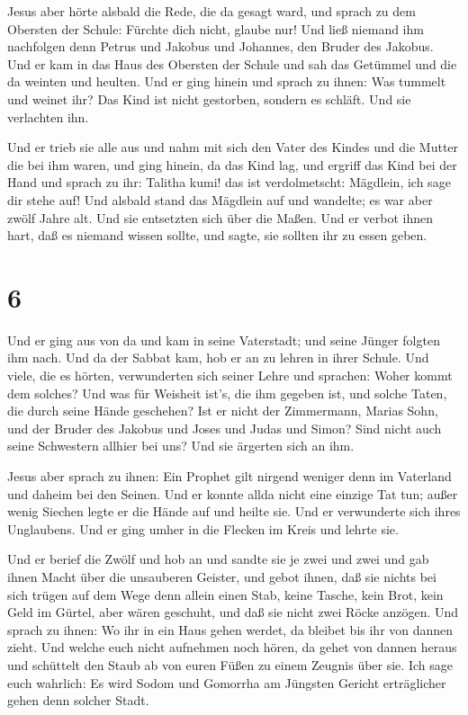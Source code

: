  Jesus aber hörte alsbald die Rede, die da gesagt ward, und
sprach zu dem Obersten der Schule: Fürchte dich nicht, glaube nur!
 Und ließ niemand ihm nachfolgen denn Petrus und Jakobus
und Johannes, den Bruder des Jakobus.  Und er kam in das
Haus des Obersten der Schule und sah das Getümmel und die da weinten und
heulten.  Und er ging hinein und sprach zu ihnen: Was
tummelt und weinet ihr? Das Kind ist nicht gestorben, sondern es
schläft. Und sie verlachten ihn.

 Und er trieb sie alle aus und nahm mit sich den Vater des
Kindes und die Mutter die bei ihm waren, und ging hinein, da das Kind
lag,  und ergriff das Kind bei der Hand und sprach zu ihr:
Talitha kumi! das ist verdolmetscht: Mägdlein, ich sage dir stehe auf!
 Und alsbald stand das Mägdlein auf und wandelte; es war
aber zwölf Jahre alt. Und sie entsetzten sich über die Maßen.
 Und er verbot ihnen hart, daß es niemand wissen sollte,
und sagte, sie sollten ihr zu essen geben.

\hypertarget{section-5}{%
\section{6}\label{section-5}}

 Und er ging aus von da und kam in seine Vaterstadt; und
seine Jünger folgten ihm nach.  Und da der Sabbat kam, hob
er an zu lehren in ihrer Schule. Und viele, die es hörten, verwunderten
sich seiner Lehre und sprachen: Woher kommt dem solches? Und was für
Weisheit ist's, die ihm gegeben ist, und solche Taten, die durch seine
Hände geschehen?  Ist er nicht der Zimmermann, Marias Sohn,
und der Bruder des Jakobus und Joses und Judas und Simon? Sind nicht
auch seine Schwestern allhier bei uns? Und sie ärgerten sich an ihm.

 Jesus aber sprach zu ihnen: Ein Prophet gilt nirgend
weniger denn im Vaterland und daheim bei den Seinen.  Und er
konnte allda nicht eine einzige Tat tun; außer wenig Siechen legte er
die Hände auf und heilte sie.  Und er verwunderte sich ihres
Unglaubens. Und er ging umher in die Flecken im Kreis und lehrte sie.

 Und er berief die Zwölf und hob an und sandte sie je zwei
und zwei und gab ihnen Macht über die unsauberen Geister, 
und gebot ihnen, daß sie nichts bei sich trügen auf dem Wege denn allein
einen Stab, keine Tasche, kein Brot, kein Geld im Gürtel, 
aber wären geschuht, und daß sie nicht zwei Röcke anzögen. 
Und sprach zu ihnen: Wo ihr in ein Haus gehen werdet, da bleibet bis ihr
von dannen zieht.  Und welche euch nicht aufnehmen noch
hören, da gehet von dannen heraus und schüttelt den Staub ab von euren
Füßen zu einem Zeugnis über sie. Ich sage euch wahrlich: Es wird Sodom
und Gomorrha am Jüngsten Gericht erträglicher gehen denn solcher Stadt.

